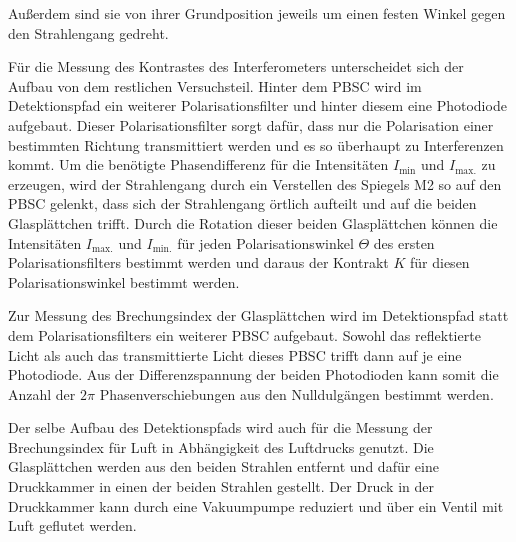 Außerdem sind sie von ihrer Grundposition jeweils um einen festen Winkel gegen den Strahlengang gedreht.
\par\medskip
Für die Messung des Kontrastes des Interferometers unterscheidet sich der Aufbau von dem restlichen Versuchsteil.
Hinter dem PBSC wird im Detektionspfad ein weiterer Polarisationsfilter und hinter diesem eine Photodiode aufgebaut.
Dieser Polarisationsfilter sorgt dafür, dass nur die Polarisation einer bestimmten Richtung transmittiert werden und es so überhaupt zu Interferenzen kommt.
Um die benötigte Phasendifferenz für die Intensitäten $I_\text{min}$ und $I_\text{max.}$ zu erzeugen, wird der Strahlengang durch ein Verstellen des Spiegels M2 so auf den PBSC gelenkt, dass sich der Strahlengang örtlich aufteilt und auf die beiden Glasplättchen trifft.
Durch die Rotation dieser beiden Glasplättchen können die Intensitäten $I_\text{max.}$ und $I_\text{min.}$ für jeden Polarisationswinkel $\Theta$ des ersten Polarisationsfilters bestimmt werden und daraus der Kontrakt $K$ für diesen Polarisationswinkel bestimmt werden.
\par\medskip
Zur Messung des Brechungsindex der Glasplättchen wird im Detektionspfad statt dem Polarisationsfilters ein weiterer PBSC aufgebaut.
Sowohl das reflektierte Licht als auch das transmittierte Licht dieses PBSC trifft dann auf je eine Photodiode.
Aus der Differenzspannung der beiden Photodioden kann somit die Anzahl der $2\pi$ Phasenverschiebungen aus den Nulldulgängen bestimmt werden.
\par\smallskip
Der selbe Aufbau des Detektionspfads wird auch für die Messung der Brechungsindex für Luft in Abhängigkeit des Luftdrucks genutzt.
Die Glasplättchen werden aus den beiden Strahlen entfernt und dafür eine Druckkammer in einen der beiden Strahlen gestellt.
Der Druck in der Druckkammer kann durch eine Vakuumpumpe reduziert und über ein Ventil mit Luft geflutet werden.
